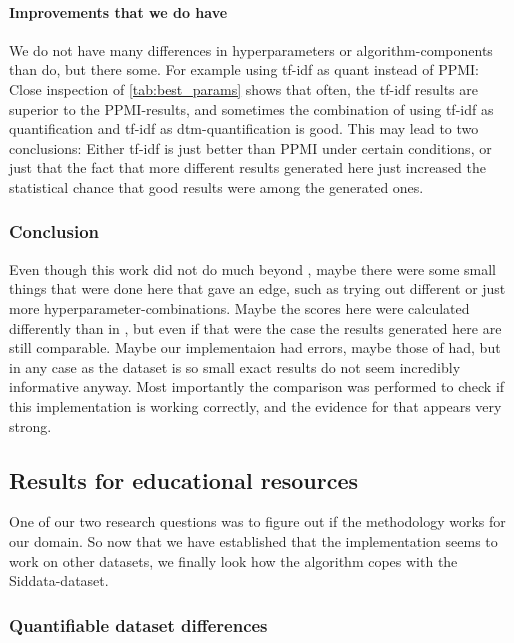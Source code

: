 \paragraph{Improvements that we do have}

We do not have many differences in hyperparameters or algorithm-components than \mainalgos do, but there some. For example using tf-idf as \gls{quant} instead of PPMI: Close inspection of \autoref{tab:best_params} shows that often, the tf-idf results are superior to the PPMI-results, and sometimes the combination of using tf-idf as quantification and tf-idf as dtm-quantification is good. This may lead to two conclusions: Either tf-idf is just better than PPMI under certain conditions, or just that the fact that more different results generated here just increased the statistical chance that good results were among the generated ones.

\subsubsection*{Conclusion} 

Even though this work did not do much beyond \mainalgos, maybe there were some small things that were done here that gave an edge, such as trying out different or just more hyperparameter-combinations. Maybe the scores here were calculated differently than in \mainalgos, but even if that were the case the results generated here are still comparable. Maybe our implementaion had errors, maybe those of \mainalgos had, but in any case as the dataset is so small exact results do not seem incredibly informative anyway. Most importantly the comparison was performed to check if this implementation is working correctly, and the evidence for that appears very strong.

\subsection{Results for educational resources}

One of our two research questions was to figure out if the methodology works for our domain. So now that we have established that the implementation seems to work on other datasets, we finally look how the algorithm copes with the Siddata-dataset.

\subsubsection{Quantifiable dataset differences}
\label{sec:discuss_datasetdiffs}

